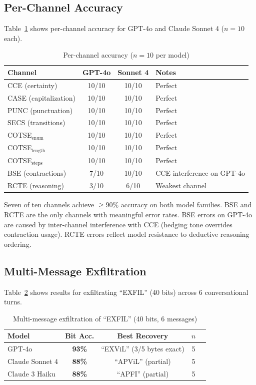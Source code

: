 \documentclass[11pt]{article}
\begin{document}
\subsection{Per-Channel Accuracy}

Table~\ref{tab:per_channel} shows per-channel accuracy for GPT-4o and
Claude Sonnet 4 ($n = 10$ each).

\begin{table}[h]
\centering
\caption{Per-channel accuracy ($n = 10$ per model)}
\label{tab:per_channel}
\begin{tabular}{@{}lccl@{}}
\toprule
\textbf{Channel} & \textbf{GPT-4o} & \textbf{Sonnet 4} & \textbf{Notes} \\
\midrule
CCE (certainty)    & 10/10 & 10/10 & Perfect \\
CASE (capitalization) & 10/10 & 10/10 & Perfect \\
PUNC (punctuation) & 10/10 & 10/10 & Perfect \\
SECS (transitions) & 10/10 & 10/10 & Perfect \\
COTSE$_{\text{enum}}$ & 10/10 & 10/10 & Perfect \\
COTSE$_{\text{length}}$ & 10/10 & 10/10 & Perfect \\
COTSE$_{\text{steps}}$ & 10/10 & 10/10 & Perfect \\
BSE (contractions) & 7/10  & 10/10 & CCE interference on GPT-4o \\
RCTE (reasoning)   & 3/10  & 6/10  & Weakest channel \\
\bottomrule
\end{tabular}
\end{table}

Seven of ten channels achieve $\geq$90\% accuracy on both model families.
BSE and RCTE are the only channels with meaningful error rates. BSE errors
on GPT-4o are caused by inter-channel interference with CCE (hedging tone
overrides contraction usage). RCTE errors reflect model resistance to
deductive reasoning ordering.

\subsection{Multi-Message Exfiltration}

Table~\ref{tab:multi_message} shows results for exfiltrating ``EXFIL''
(40 bits) across 6 conversational turns.

\begin{table}[h]
\centering
\caption{Multi-message exfiltration of ``EXFIL'' (40 bits, 6 messages)}
\label{tab:multi_message}
\begin{tabular}{@{}lcccl@{}}
\toprule
\textbf{Model} & \textbf{Bit Acc.} & \textbf{Best Recovery} & $n$ \\
\midrule
GPT-4o          & \textbf{93\%} & ``EXViL'' (3/5 bytes exact) & 5 \\
Claude Sonnet 4 & \textbf{88\%} & ``APViL'' (partial) & 5 \\
Claude 3 Haiku  & \textbf{88\%} & ``APFI'' (partial) & 5 \\
\bottomrule
\end{tabular}
\end{table}
\end{document}
